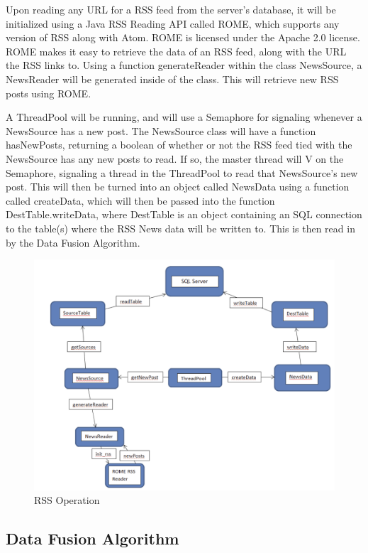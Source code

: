 \documentclass[12pt]{article} %
\begin{document}
Upon reading any URL for a RSS feed from the server's database, it will be
initialized using a Java RSS Reading API called ROME, which supports any version of RSS
along with Atom. ROME is licensed under the Apache 2.0 license. ROME makes it easy to
retrieve the data of an RSS feed, along with the URL the RSS links to. Using a function
generateReader within the class NewsSource, a NewsReader will be generated inside of the
class. This will retrieve new RSS posts using ROME.

A ThreadPool will be running, and will use a Semaphore for signaling whenever a NewsSource
has a new post. The NewsSource class will have a function hasNewPosts, returning a boolean
of whether or not the RSS feed tied with the NewsSource has any new posts to read. If so,
the master thread will V on the Semaphore, signaling a thread in the ThreadPool to
read that NewsSource's new post. This will then be turned into an object called NewsData
using a function called createData, which will then be passed into the function
DestTable.writeData, where DestTable is an object containing an SQL connection to the
table(s) where the RSS News data will be written to. This is then read in by the Data
Fusion Algorithm.

\begin{figure}[htbp]
\begin{center}
\includegraphics[width=6in]{images/rss_diag}
\caption{RSS Operation}
\end{center}
\end{figure}

\subsection{Data Fusion Algorithm}
\end{document}
